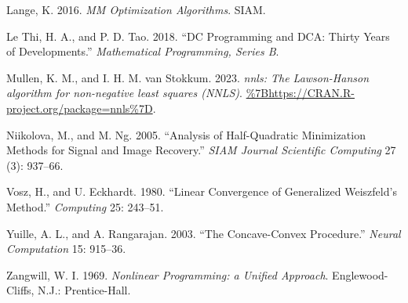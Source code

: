 \documentclass[
  12pt,
]{article}
\newlength{\cslhangindent}
\newenvironment{CSLReferences}[2] %
 {\begin{list}{}{%
  \setlength{\itemindent}{0pt}
  \setlength{\leftmargin}{0pt}
  \setlength{\parsep}{0pt}
  \ifodd #1
   \setlength{\leftmargin}{\cslhangindent}
   \setlength{\itemindent}{-1\cslhangindent}
  \fi
  \setlength{\itemsep}{#2\baselineskip}}}
 {\end{list}}
\begin{document}
\begin{CSLReferences}{1}{0}
Lange, K. 2016. \emph{MM Optimization Algorithms}. SIAM.

Le Thi, H. A., and P. D. Tao. 2018. {``{DC Programming and DCA: Thirty Years of Developments}.''} \emph{Mathematical Programming, Series B}.

Mullen, K. M., and I. H. M. van Stokkum. 2023. \emph{{nnls: The Lawson-Hanson algorithm for non-negative least squares (NNLS)}}. \url{\%7Bhttps://CRAN.R-project.org/package=nnls\%7D}.

Niikolova, M., and M. Ng. 2005. {``Analysis of Half-Quadratic Minimization Methods for Signal and Image Recovery.''} \emph{SIAM Journal Scientific Computing} 27 (3): 937--66.

Vosz, H., and U. Eckhardt. 1980. {``{Linear Convergence of Generalized {W}eiszfeld's Method}.''} \emph{Computing} 25: 243--51.

Yuille, A. L., and A. Rangarajan. 2003. {``{The Concave-Convex Procedure}.''} \emph{Neural Computation} 15: 915--36.

Zangwill, W. I. 1969. \emph{{Nonlinear Programming: a Unified Approach}}. Englewood-Cliffs, N.J.: Prentice-Hall.

\end{CSLReferences}
\end{document}
